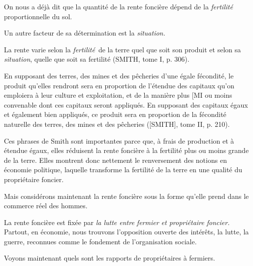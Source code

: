 \documentclass[french,twoside]{book} %
\newcommand\foreign[1]{\emph{#1}}
\newenvironment{quoteblock}%
  {\begin{quoting}}
  {\end{quoting}}
\newenvironment{quotebar}{%
    \def\FrameCommand{{\color{rubric!10!}\vrule width 0.5em} \hspace{0.9em}}%
    \def\OuterFrameSep{\itemsep} %
    \MakeFramed {\advance\hsize-\width \FrameRestore}
  }%
  {%
    \endMakeFramed
  }
\renewenvironment{quoteblock}%
  {%
    \savenotes
    \setstretch{0.9}
    \normalfont
    \begin{quotebar}
  }
  {%
    \end{quotebar}
    \spewnotes
  }
\begin{document}
\noindent On nous a déjà dit que la quantité de la rente foncière dépend de la \emph{fertilité} proportionnelle du sol.\par
Un autre facteur de sa détermination est la \emph{situation.}\par

\begin{quoteblock}
 \noindent La rente varie selon la \foreign{fertilité} de la terre quel que soit son produit et selon sa \foreign{situation}, quelle que soit sa fertilité (SMITH, tome I, p. 306).\par
 En supposant des terres, des mines et des pêcheries d’une égale fécondité, le produit qu’elles rendront sera en proportion de l’étendue des capitaux qu’on emploiera à leur culture et exploitation, et de la manière plus [MI ou moins convenable dont ces capitaux seront appliqués. En supposant des capitaux égaux et également bien appliqués, ce produit sera en proportion de la fécondité naturelle des terres, des mines et des pêcheries ([SMITH], tome II, p. 210).
 \end{quoteblock}

\noindent Ces phrases de Smith sont importantes parce que, à frais de production et à étendue égaux, elles réduisent la rente foncière à la fertilité plus ou moins grande de la terre. Elles montrent donc nettement le renversement des notions en économie politique, laquelle transforme la fertilité de la terre en une qualité du propriétaire foncier.\par
Mais considérons maintenant la rente foncière sous la forme qu’elle prend dans le commerce réel des hommes.\par
La rente foncière est fixée par \emph{la lutte entre fermier et propriétaire foncier.} Partout, en économie, nous trouvons l’opposition ouverte des intérêts, la lutte, la guerre, reconnues comme le fondement de l’organisation sociale.\par
Voyons maintenant quels sont les rapports de propriétaires à fermiers.\par
\end{document}
